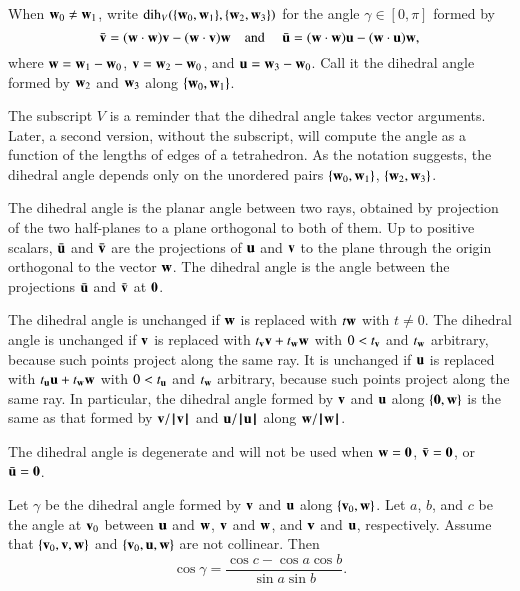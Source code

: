 \begin{definition}\label{def:dih} When ${\mathbf w}_0\ne {\mathbf w}_1$,
write $\operatorname{dih}_V(\{{\mathbf w}_0,{\mathbf w}_1\},\{{\mathbf w}_2,{\mathbf w}_3\})$ for the angle $\gamma\in[0,\pi]$
formed
by 
    $$
    \bar {{\mathbf v}} = ({\mathbf w}\cdot {\mathbf w}) {\mathbf v} - ({\mathbf w}\cdot {\mathbf v}) {\mathbf w}\quad\text{and }\quad \bar {{\mathbf u}} =
            ({\mathbf w}\cdot {\mathbf w}) {\mathbf u} - ({\mathbf w}\cdot {\mathbf u}) {\mathbf w},
    $$
where ${\mathbf w}={\mathbf w}_1-{\mathbf w}_0$, ${\mathbf v} = {\mathbf w}_2-{\mathbf w}_0$,  and ${\mathbf u}={\mathbf w}_3-{\mathbf w}_0$.  Call it
the dihedral angle formed by ${\mathbf w}_2$ and ${\mathbf w}_3$ along $\{{\mathbf w}_0,{\mathbf w}_1\}$.
%
%
\end{definition}
The subscript $V$ is a reminder 
that the dihedral angle takes vector arguments.
Later, a second version, without the subscript, will
compute the angle as a function of the lengths of edges of a 
tetrahedron.
%
%
As the notation suggests, the dihedral angle depends only
on the unordered pairs $\{{\mathbf w}_0,{\mathbf w}_1\}$, $\{{\mathbf w}_2,{\mathbf w}_3\}$.

The dihedral angle is the planar angle between two rays, obtained by projection of the two half-planes to a plane orthogonal to both of them.
Up to positive scalars, $\bar {{\mathbf u}}$ and $\bar {{\mathbf v}}$ are the projections of
${\mathbf u}$ and ${\mathbf v}$ to the plane through the origin orthogonal to the vector ${\mathbf w}$.  The
dihedral angle is the angle between the projections
$\bar {{\mathbf u}}$ and $\bar {{\mathbf v}}$ at ${\mathbf 0}$.

\begin{remark}\label{rem:dih}
The dihedral angle is unchanged if ${\mathbf w}$ is replaced with $t {\mathbf w}$ with
$t\ne0$. The dihedral angle is unchanged if ${\mathbf v}$ is replaced with
$t_{\mathbf v} {\mathbf v} + t_{\mathbf w} {\mathbf w}$ with $0 < t_{\mathbf v}$ and $t_{\mathbf w}$ arbitrary, because such points project along the same ray.  
It is unchanged if
${\mathbf u}$ is replaced with $t_{\mathbf u} {\mathbf u} + t_{\mathbf w} {\mathbf w}$ with $0 < t_{\mathbf u}$ and $t_{\mathbf w}$
arbitrary, because such points project along the same ray.  In particular, the dihedral angle formed by ${\mathbf v}$ and
${\mathbf u}$ along $\{{\mathbf 0},{\mathbf w}\}$ is the same as that formed by ${\mathbf v}/{{\hskip0.1em|\hskip-0.15em|\hskip0.1em}{\mathbf v}{\hskip0.1em|\hskip-0.15em|\hskip0.1em}}$ and
${\mathbf u}/{{\hskip0.1em|\hskip-0.15em|\hskip0.1em}{\mathbf u}{\hskip0.1em|\hskip-0.15em|\hskip0.1em}}$ along ${\mathbf w}/{{\hskip0.1em|\hskip-0.15em|\hskip0.1em}{\mathbf w}{\hskip0.1em|\hskip-0.15em|\hskip0.1em}}$.
\end{remark}

The dihedral angle is degenerate and will not be used when ${\mathbf w} =
{\mathbf 0}$, $\bar {{\mathbf v}} = {\mathbf 0}$, or $\bar {{\mathbf u}} = {\mathbf 0}$.

\begin{lemma}\label{lemma:sloc}
Let $\gamma$ be the dihedral angle formed by ${\mathbf v}$ and ${\mathbf u}$ along
$\{{\mathbf v}_0,{\mathbf w}\}$.  Let $a$, $b$, and $c$ be the
angle at ${\mathbf v}_0$ between ${\mathbf u}$ and ${\mathbf w}$, ${\mathbf v}$ and ${\mathbf w}$, and ${\mathbf v}$ and
${\mathbf u}$, respectively. %
Assume that $\{{\mathbf v}_0,{\mathbf v},{\mathbf w}\}$ and $\{{\mathbf v}_0,{\mathbf u},{\mathbf w}\}$ are not collinear.
Then
    $$\cos\gamma = \frac{\cos c - \cos a \cos b}{\sin a\sin b}.$$
\end{lemma}
%
%
%

